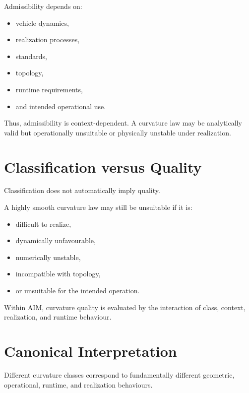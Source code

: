 Admissibility depends on:
\begin{itemize}
\item vehicle dynamics,
\item realization processes,
\item standards,
\item topology,
\item runtime requirements,
\item and intended operational use.
\end{itemize}

Thus, admissibility is context-dependent.
A curvature law may be analytically valid but operationally unsuitable
or physically unstable under realization.

\section{Classification versus Quality}

Classification does not automatically imply quality.

A highly smooth curvature law may still be unsuitable if it is:
\begin{itemize}
\item difficult to realize,
\item dynamically unfavourable,
\item numerically unstable,
\item incompatible with topology,
\item or unsuitable for the intended operation.
\end{itemize}

Within AIM, curvature quality is evaluated by the interaction of class,
context, realization, and runtime behaviour.

\section{Canonical Interpretation}

\begin{proposition}
Different curvature classes correspond to fundamentally different
geometric, operational, runtime, and realization behaviours.
\end{proposition}

